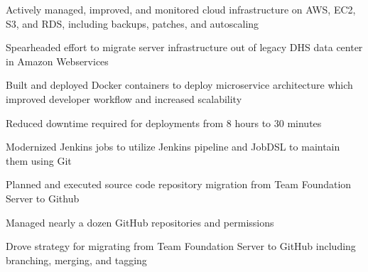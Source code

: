 \begin{cventries}
{\begin{cvitems}
        \item {Actively managed, improved, and monitored cloud infrastructure on AWS, EC2, S3, and RDS, including backups, patches, and autoscaling}
        \item {Spearheaded effort to migrate server infrastructure out of legacy DHS data center in Amazon Webservices}
        \item {Built and deployed Docker containers to deploy microservice architecture which improved developer workflow and increased scalability}
        \item {Reduced downtime required for deployments from 8 hours to 30 minutes}
        \item {Modernized Jenkins jobs to utilize Jenkins pipeline and JobDSL to maintain them using Git}
        \item {Planned and executed source code repository migration from Team Foundation Server to Github}
        \item {Managed nearly a dozen GitHub repositories and permissions}
        \item {Drove strategy for migrating from Team Foundation Server to GitHub including branching, merging, and tagging}
      \end{cvitems}
    }


\end{cventries}
